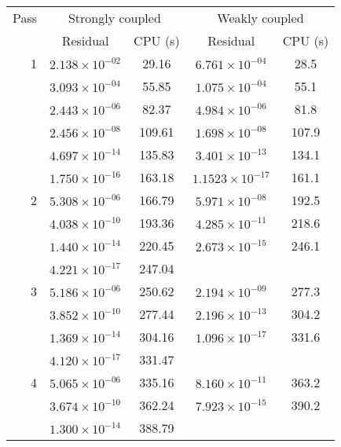 \begin{table}
\begin{center}
\begin{tabular}{|r|c|c|c|c|}
  \hline
  Pass & \multicolumn{2}{c|}{Strongly coupled} &
         \multicolumn{2}{c|}{Weakly coupled}\\
  \cline{2-5} & Residual & CPU (s) & Residual & CPU (s)\\
  \hline\hline 
1     & $ 2.138\times 10^{-02}$ &   29.16   & $6.761 \times 10^{-04}$  &    28.5 \\
      & $ 3.093\times 10^{-04}$ &   55.85   & $1.075 \times 10^{-04}$  &    55.1 \\
      & $ 2.443\times 10^{-06}$ &   82.37   & $4.984 \times 10^{-06}$  &    81.8 \\
      & $ 2.456\times 10^{-08}$ &  109.61   & $1.698 \times 10^{-08}$  &   107.9 \\
      & $ 4.697\times 10^{-14}$ &  135.83   & $3.401 \times 10^{-13}$  &   134.1 \\
      & $ 1.750\times 10^{-16}$ &  163.18   & $1.1523\times 10^{-17}$  &   161.1 \\
\hline                                    
2     & $ 5.308\times 10^{-06}$ &  166.79   & $5.971 \times 10^{-08}$  &  192.5  \\
      & $ 4.038\times 10^{-10}$ &  193.36   & $4.285 \times 10^{-11}$  &  218.6  \\
      & $ 1.440\times 10^{-14}$ &  220.45   & $2.673 \times 10^{-15}$  &  246.1  \\
      & $ 4.221\times 10^{-17}$ &  247.04   & $                    $   &  \\
\hline                                    
3     & $ 5.186\times 10^{-06}$ &  250.62   & $2.194 \times 10^{-09}$  &  277.3  \\
      & $ 3.852\times 10^{-10}$ &  277.44   & $2.196 \times 10^{-13}$  &  304.2   \\
      & $ 1.369\times 10^{-14}$ &  304.16   & $1.096 \times 10^{-17}$  &  331.6   \\
      & $ 4.120\times 10^{-17}$ &  331.47   & $                    $   &  \\
\hline                                    
4     & $ 5.065\times 10^{-06}$ &  335.16   & $8.160 \times 10^{-11}$  &  363.2 \\ 
      & $ 3.674\times 10^{-10}$ &  362.24   & $7.923 \times 10^{-15}$  &  390.2 \\
      & $ 1.300\times 10^{-14}$ &  388.79   & $                    $   &  \\

\end{tabular}
\end{center}
\end{table}
